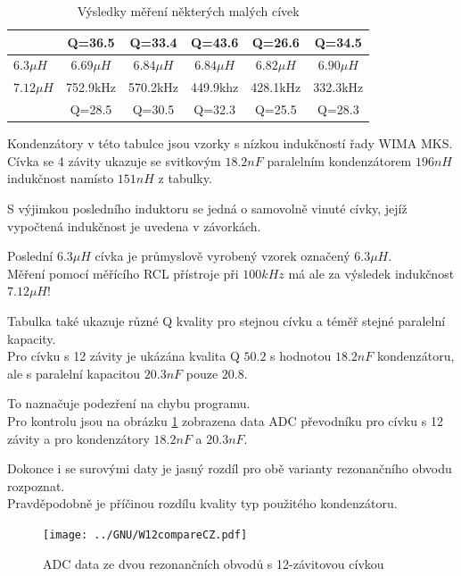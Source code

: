 \begin{table}[H]
\begin{center}
\begin{tabular}{| l | c | c | c | c | c |}
              & Q=36.5    & Q=33.4    & Q=43.6    & Q=26.6    & Q=34.5  \\
\hline
\(6.3\mu H\)  & \(6.69\mu H\) & \(6.84\mu H\) & \(6.84\mu H\) & \(6.82\mu H\) & \(6.90\mu H\)  \\
\(7.12\mu H\) & 752.9kHz  & 570.2kHz  & 449.9khz  & 428.1kHz  & 332.3kHz \\
              & Q=28.5    & Q=30.5    & Q=32.3    & Q=25.5    & Q=28.3  \\
\hline
\end{tabular}
\end{center}
\caption{Výsledky měření některých malých cívek}
\label{tab:littleInductors}
\end{table}

 Kondenzátory v této tabulce jsou vzorky s nízkou indukčností řady WIMA MKS.\\ Cívka se 4 závity ukazuje se svitkovým \(18.2nF\) paralelním kondenzátorem \(196nH\) indukčnost namísto \(151nH\)  z tabulky.
 
S výjimkou posledního induktoru se jedná o samovolně vinuté cívky,
jejíž vypočtená indukčnost je uvedena v závorkách.

Poslední \(6.3\mu H\) cívka je průmyslově vyrobený vzorek označený \(6.3\mu H\).\\
Měření pomocí měřícího  RCL přístroje při \(100kHz\) má ale za výsledek indukčnost \(7.12\mu H\)!

Tabulka také ukazuje různé Q kvality pro stejnou cívku a téměř stejné paralelní kapacity.\\ Pro cívku s 12 závity je ukázána kvalita Q \(50.2\) s hodnotou \(18.2nF\) kondenzátoru, ale s paralelní kapacitou \(20.3nF\) pouze \(20.8\).

To naznačuje podezření na chybu programu.\\
Pro kontrolu jsou na obrázku \ref{fig:W12compare} zobrazena data  ADC převodníku pro cívku s 12 závity a pro kondenzátory \(18.2nF\) a \(20.3nF\).

Dokonce i se surovými daty je jasný rozdíl pro obě varianty rezonančního obvodu rozpoznat.\\ Pravděpodobně je  příčinou rozdílu kvality typ použitého kondenzátoru.

\begin{figure}[H]
\centering
\texttt{[image: ../GNU/W12compareCZ.pdf]}
\caption{ ADC data ze dvou rezonančních obvodů s 12-závitovou cívkou}
\label{fig:W12compare}
\end{figure}

